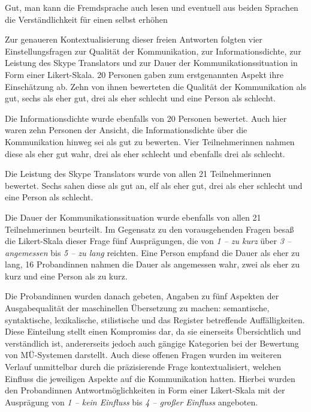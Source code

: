 \begin{example}
    \label{K6:exp:Translator-original}
    Gut, man kann die Fremdsprache auch lesen und eventuell aus beiden Sprachen die Verständlichkeit für einen selbst erhöhen
\end{example}

Zur genaueren Kontextualisierung dieser freien Antworten folgten vier Einstellungsfragen zur Qualität der Kommunikation, zur Informationsdichte, zur Leistung des Skype Translators und zur Dauer der Kommunikationssituation in Form einer Likert-Skala. 20 Personen gaben zum erstgenannten Aspekt ihre Einschätzung ab. Zehn von ihnen bewerteten die Qualität der Kommunikation als gut, sechs als eher gut, drei als eher schlecht und eine Person als schlecht. 

Die Informationsdichte wurde ebenfalls von 20 Personen bewertet. Auch hier waren zehn Personen der Ansicht, die Informationsdichte über die Kommunikation hinweg sei als gut zu bewerten. Vier Teilnehmer{\textperiodcentered}innen nahmen diese als eher gut wahr, drei als eher schlecht und ebenfalls drei als schlecht.

Die Leistung des Skype Translators wurde von allen 21 Teilnehmer{\textperiodcentered}innen bewertet. Sechs sahen diese als gut an, elf als eher gut, drei als eher schlecht und eine Person als schlecht.

Die Dauer der Kommunikationssituation wurde ebenfalls von allen 21 Teilnehmer{\textperiodcentered}innen beurteilt. Im Gegensatz zu den vorausgehenden Fragen besaß die Likert-Skala dieser Frage fünf Ausprägungen, die von \emph{1 – zu kurz} über \emph{3 – angemessen} bis \emph{5 – zu lang} reichten. Eine Person empfand die Dauer als eher zu lang, 16 Proband{\textperiodcentered}innen nahmen die Dauer als angemessen wahr, zwei als eher zu kurz und eine Person als zu kurz. 

Die Proband{\textperiodcentered}innen wurden danach gebeten, Angaben zu fünf Aspekten der Ausgabequalität der maschinellen Übersetzung zu machen: semantische, syntaktische, lexikalische, stilistische und das Register betreffende Auffälligkeiten. Diese Einteilung stellt einen Kompromiss dar, da sie einerseits Übersichtlich und verständlich ist, andererseits jedoch auch gängige Kategorien bei der Bewertung von MÜ-Systemen darstellt. Auch diese offenen Fragen wurden im weiteren Verlauf unmittelbar durch die präzisierende Frage kontextualisiert, welchen Einfluss die jeweiligen Aspekte auf die Kommunikation hatten. Hierbei wurden den Proband{\textperiodcentered}innen Antwortmöglichkeiten in Form einer Likert-Skala mit der Ausprägung von \emph{1 – kein Einfluss} bis \emph{4 – großer Einfluss} angeboten.

